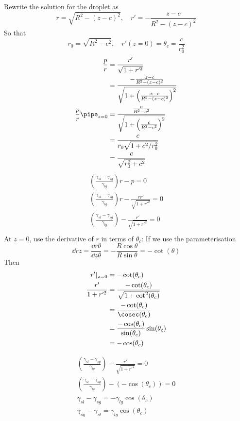 \documentclass{X:/Documents/Coding/Latex/myassignment}
\begin{document}
\begin{enumerate}
\begin{enumerate}
	Rewrite the solution for the droplet as
	\[r = \sqrt{R^2 - (z-c)^2}, \quad r' = -\frac{z-c}{R^2 - (z-c)^2} \]
	So that
	\[r_0 = \sqrt{R^2 - c^2}, \quad r'(z=0) = \theta_c = \frac{c}{r_0^2}\]
	\begin{align*}
		\frac{p}{r} &=  \frac{r'}{\sqrt{1+r'^2}}\\
		&=\frac{-\frac{z-c}{R^2 - (z-c)^2}}{\sqrt{1 + \left(\frac{z-c}{R^2 - (z-c)^2}\right)^2 }}\\
		\frac{p}{r}\pipe_{z=0} &=\frac{\frac{c}{R^2 - c^2}}{\sqrt{1 + \left(\frac{c}{R^2 - c^2}\right)^2 }}\\
		&= \frac{c}{r_0 \sqrt{1 + c^2/r_0^2}}\\
		&= \frac{c}{\sqrt{r_0^2 + c^2}}\\
	\end{align*}
	\begin{align*}
		\left(\frac{\gamma_{sl} - \gamma_{sg}}{\gamma_{lg}} \right)r - p =0\\
		\left(\frac{\gamma_{sl} - \gamma_{sg}}{\gamma_{lg}} \right)r -  \frac{rr'}{\sqrt{1+r'^2}}=0\\
		\left(\frac{\gamma_{sl} - \gamma_{sg}}{\gamma_{lg}} \right) -  \frac{r'}{\sqrt{1+r'^2}}=0\\
	\end{align*}
	At $z = 0$, use the derivative of $r$ in terms of $\theta_c$:
	If we use the parameterisation 
	\[\dd rz = \frac{\dd r\theta}{\dd z\theta} = - \frac{R\cos\theta}{R\sin\theta} = -\cot(\theta) \]
	Then 
	\begin{align*}
		r'|_{z=0} &= -\cot(\theta_c)\\
		\frac{r'}{1+r'^2} &= \frac{-\cot(\theta_c)}{\sqrt{1 +\cot^2(\theta_c)}}\\
		&= \frac{-\cot(\theta_c)}{\cosec(\theta_c)}\\
		&= \frac{-\cos(\theta_c)}{\sin(\theta_c)} \sin(\theta_c)\\
		&= -\cos(\theta_c)
	\end{align*}
	
	\begin{align*}
		\left(\frac{\gamma_{sl} - \gamma_{sg}}{\gamma_{lg}} \right) -  \frac{r'}{\sqrt{1+r'^2}}=0\\
		\left(\frac{\gamma_{sl} - \gamma_{sg}}{\gamma_{lg}} \right) - (-\cos(\theta_c))=0\\
		\gamma_{sl} - \gamma_{sg} = - \gamma_{lg}\cos(\theta_c)\\
		\gamma_{sg} - \gamma_{sl} =  \gamma_{lg}\cos(\theta_c)\\
	\end{align*}




\end{enumerate}
\end{enumerate}
\end{document}
